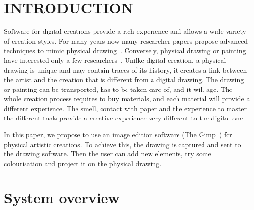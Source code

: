 \documentclass{article}
\begin{document}




\section{INTRODUCTION}

Software for digital creations provide a rich experience and allows a wide variety of creation styles. For many years now many researcher papers propose advanced techniques to mimic physical drawing~\cite{VBGS08}. Conversely, physical drawing or painting have interested only a few researchers~\cite{flagg2006projector}. Unilke digital creation, a physical drawing is unique and may contain traces of its history, 
 it creates a link between the artist and the creation that is different from a digital drawing.
The drawing or painting can be transported, has to be taken care of, and it will age. The whole creation process requires to buy materials, and each material will provide a different experience. The smell, contact with paper and the experience to master the different tools provide a creative experience very different to the digital one. 

In this paper, we propose to use an image edition software (The Gimp~\cite{gimp2004image}) for physical artistic creations. To achieve this, the drawing is captured and sent to the drawing software. Then the user can add new elements, try some colourisation and project it on the physical drawing.


\section{System overview}

\end{document}

